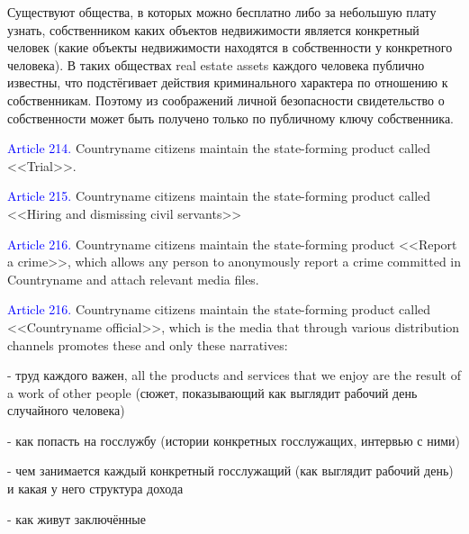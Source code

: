 \documentclass[11pt]{article}
\theoremstyle{remark}
\theoremstyle{definition}
\begin{document}
\color{blue}


Существуют общества, в которых можно бесплатно либо за небольшую плату узнать, собственником каких объектов недвижимости является конкретный человек (какие объекты недвижимости находятся в собственности у конкретного человека). В таких обществах real estate assets каждого человека публично известны, что подстёгивает действия криминального характера по отношению к собственникам. Поэтому из соображений личной безопасности свидетельство о собственности может быть получено только по публичному ключу собственника.


\color{black}

\textcolor{blue}{Article 214.} Countryname citizens maintain the state-forming product called <<Trial>>.

\color{blue}


\color{black}


\textcolor{blue}{Article 215.} Countryname citizens maintain the state-forming product called <<Hiring and dismissing civil servants>>





\textcolor{blue}{Article 216.} Countryname citizens maintain the state-forming product <<Report a crime>>, which allows any person to anonymously report a crime committed in Countryname and attach relevant media files. 










\textcolor{blue}{Article 216.} Countryname citizens maintain the state-forming product called <<Countryname official>>, which is the media that through various distribution channels promotes these and only these narratives:

- труд каждого важен, all the products and services that we enjoy are the result of a work of other people (сюжет, показывающий как выглядит рабочий день случайного человека)

- как попасть на госслужбу (истории конкретных госслужащих, интервью с ними)

- чем занимается каждый конкретный госслужащий (как выглядит рабочий день) и какая у него структура дохода

- как живут заключённые
\end{document}
